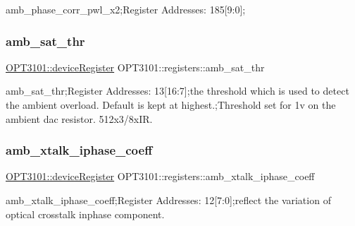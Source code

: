 amb\+\_\+phase\+\_\+corr\+\_\+pwl\+\_\+x2;Register Addresses\+: 185\mbox{[}9\+:0\mbox{]}; 

\mbox{\label{class_o_p_t3101_1_1registers_a12bd5d02a0a04d12708531dd59c13542}} 
\subsubsection{\texorpdfstring{amb\+\_\+sat\+\_\+thr}{amb\_sat\_thr}}
{\footnotesize\ttfamily \mbox{\hyperlink{class_o_p_t3101_1_1device_register}{O\+P\+T3101\+::device\+Register}} O\+P\+T3101\+::registers\+::amb\+\_\+sat\+\_\+thr}



amb\+\_\+sat\+\_\+thr;Register Addresses\+: 13\mbox{[}16\+:7\mbox{]};the threshold which is used to detect the ambient overload. Default is kept at highest.;Threshold set for 1v on the ambient dac resistor. 512x3/8x\+IR. 

\mbox{\label{class_o_p_t3101_1_1registers_a14655b9b47629fcc2a1240b9c6abec0d}} 
\subsubsection{\texorpdfstring{amb\+\_\+xtalk\+\_\+iphase\+\_\+coeff}{amb\_xtalk\_iphase\_coeff}}
{\footnotesize\ttfamily \mbox{\hyperlink{class_o_p_t3101_1_1device_register}{O\+P\+T3101\+::device\+Register}} O\+P\+T3101\+::registers\+::amb\+\_\+xtalk\+\_\+iphase\+\_\+coeff}



amb\+\_\+xtalk\+\_\+iphase\+\_\+coeff;Register Addresses\+: 12\mbox{[}7\+:0\mbox{]};reflect the variation of optical crosstalk inphase component. 

\mbox{\label{class_o_p_t3101_1_1registers_a3dce7bd901ac52a70ba9830dbf010e5f}} 
